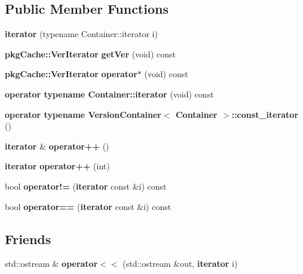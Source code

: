 \subsection*{\-Public \-Member \-Functions}
\begin{DoxyCompactItemize}
\item 
{\bfseries iterator} (typename \-Container\-::iterator i)\label{classAPT_1_1VersionContainer_1_1iterator_a5c6e5c8e05a41906509194e7c2c133c3}

\item 
{\bf pkg\-Cache\-::\-Ver\-Iterator} {\bfseries get\-Ver} (void) const \label{classAPT_1_1VersionContainer_1_1iterator_a23ea0f71c715e15423b567ea0846d727}

\item 
{\bf pkg\-Cache\-::\-Ver\-Iterator} {\bfseries operator$\ast$} (void) const \label{classAPT_1_1VersionContainer_1_1iterator_a67d5804950c0e874d9cf252086e47e0a}

\item 
{\bfseries operator typename Container\-::iterator} (void) const \label{classAPT_1_1VersionContainer_1_1iterator_ae8994dcb1ebfd91f79c7a145e33e200f}

\item 
{\bfseries operator typename Version\-Container$<$ Container $>$\-::const\-\_\-iterator} ()\label{classAPT_1_1VersionContainer_1_1iterator_acdac07d0f83fa0d50312aa7bf506bf91}

\item 
{\bf iterator} \& {\bfseries operator++} ()\label{classAPT_1_1VersionContainer_1_1iterator_af1b1c7856a59f34c7d3570f946a2ff00}

\item 
{\bf iterator} {\bfseries operator++} (int)\label{classAPT_1_1VersionContainer_1_1iterator_a538d230f8b52d2bc0950e26ce74ec239}

\item 
bool {\bfseries operator!=} ({\bf iterator} const \&i) const \label{classAPT_1_1VersionContainer_1_1iterator_a794abc0af03e4e4e24e1b6938969fe46}

\item 
bool {\bfseries operator==} ({\bf iterator} const \&i) const \label{classAPT_1_1VersionContainer_1_1iterator_a1db698b37e59f1c8816f980935da529c}

\end{DoxyCompactItemize}
\subsection*{\-Friends}
\begin{DoxyCompactItemize}
\item 
std\-::ostream \& {\bfseries operator$<$$<$} (std\-::ostream \&out, {\bf iterator} i)\label{classAPT_1_1VersionContainer_1_1iterator_aacdf1b6835cfa9ad97cb9f10c53bb191}

\end{DoxyCompactItemize}
